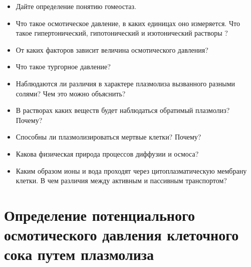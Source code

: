 	\begin{itemize}
		\item Дайте определение понятию \hypertarget{gomiostatsis_question}{гомеостаз}.
		\item Что такое осмотическое давление, в каких единицах оно измеряется. Что такое \hypertarget{hypertonik_liquid}{гипертонический}, гипотонический и изотонический растворы \cite{chem_kuzmenko_eremin}?
		\item От каких факторов зависит величина осмотического давления?
		\item Что такое тургорное давление?
		\item Наблюдаются ли различия в характере плазмолиза вызванного разными солями? Чем это можно объяснить?
		\item В растворах каких веществ будет наблюдаться \hypertarget{reversable_plasmolisys}{обратимый плазмолиз}? Почему?
		\item Способны ли плазмолизироваться мертвые клетки? Почему?
		\item Какова физическая природа процессов диффузии и осмоса?
		\item Каким образом ионы и вода проходят через цитоплазматическую мембрану клетки. В чем различия между активным и пассивным транспортом?
	\end{itemize}


\section*{\lbtitle Определение потенциального осмотического давления клеточного сока путем плазмолиза}




